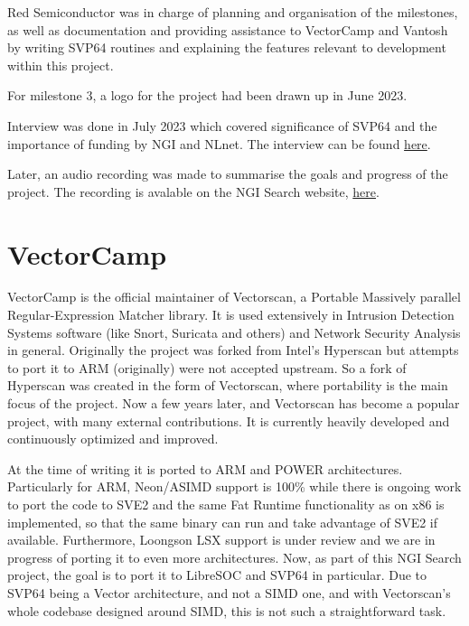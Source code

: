 Red Semiconductor was in charge of planning and organisation of the milestones,
as well as documentation and providing assistance to VectorCamp and Vantosh
by writing SVP64 routines and explaining the features relevant to development
within this project.

For milestone 3, a logo for the project had been drawn up in June 2023.

Interview was done in July 2023 which covered significance of SVP64 and
the importance of funding by NGI and NLnet.
The interview can be found
\href{https://spaces.fundingbox.com/spaces/ngi-community-ngi-innovators/64b8dadbabf7a659885ee01e}{here}.

Later, an audio recording was made to summarise the goals and progress of the
project. The recording is avalable on the NGI Search website, 
\href{https://www.ngisearch.eu/view/Events/OC1Searchers}{here}.

\section{VectorCamp}

VectorCamp is the official maintainer of Vectorscan, a Portable Massively
parallel Regular-Expression Matcher library. It is used extensively in
Intrusion Detection Systems software (like Snort, Suricata and others)
and Network Security Analysis in general. Originally the project was forked
from Intel’s Hyperscan but attempts to port it to ARM (originally) were not
accepted upstream. So a fork of Hyperscan was created in the form of
Vectorscan, where portability is the main focus of the project.
Now a few years later, and Vectorscan has become a popular project,
with many external contributions. It is currently heavily developed and
continuously optimized and improved.

At the time of writing it is ported
to ARM and POWER architectures. Particularly for ARM, Neon/ASIMD support
is 100\% while there is ongoing work to port the code to SVE2 and
the same Fat Runtime functionality as on x86 is implemented,
so that the same binary can run and take advantage of SVE2 if available.
Furthermore, Loongson LSX support is under review and we are in progress of
porting it to even more architectures.
Now, as part of this NGI Search project, the goal is to port it to LibreSOC
and SVP64 in particular. Due to SVP64 being a Vector architecture,
and not a SIMD one, and with Vectorscan’s whole codebase designed around SIMD,
this is not such a straightforward task.

